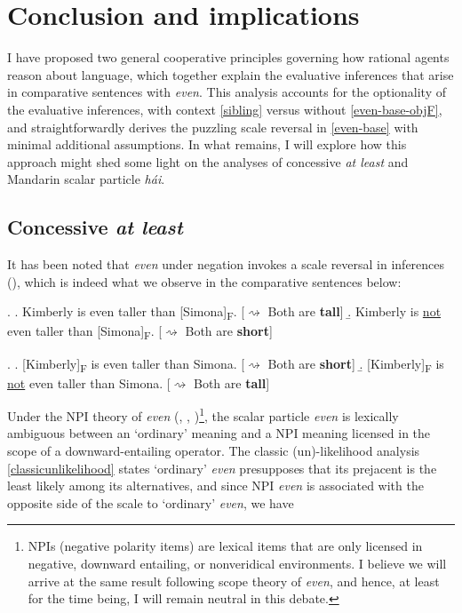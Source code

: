 \documentclass[12pt,letterpaper]{scrartcl}
\newcommand{\alignright}{\hspace*{\fill}}
\newcommand{\infer}{$\rightsquigarrow$ }
\newcommand{\sub}[1]{\textsubscript{#1}}
\begin{document}
\section{Conclusion and implications}

I have proposed two general cooperative principles governing how rational agents reason about language, which together explain the evaluative inferences that arise in comparative sentences with \textit{even}. This analysis accounts for the optionality of the evaluative inferences, with context \ref{sibling} versus without \ref{even-base-objF}, and straightforwardly derives the puzzling scale reversal in \ref{even-base} with minimal additional assumptions. In what remains, I will explore how this approach might shed some light on the analyses of concessive \textit{at least} and Mandarin scalar particle \textit{h\'{a}i}.

\subsection{Concessive \textit{at least}} 

It has been noted that \textit{even} under negation invokes a scale reversal in inferences (\cite{karttunen_conventional_1979}), which is indeed what we observe in the comparative sentences below:

\ex. \a. Kimberly is even taller than [Simona]\sub{F}. \alignright [\infer Both are \textbf{tall}] 
\b. Kimberly is \underline{not} even taller than [Simona]\sub{F}. \alignright [\infer Both are \textbf{short}] \label{not-even-objF}

\ex. \a. [Kimberly]\sub{F} is even taller than Simona. \alignright [\infer Both are \textbf{short}] 
\b. [Kimberly]\sub{F} is \underline{not} even taller than Simona. \alignright [\infer Both are \textbf{tall}] \label{not-even-subF}

Under the NPI theory of \textit{even} (\cite{rooth_association_1985}, \cite{rullmann_even_1997}, \cite{giannakidou_landscape_2007})\footnote{NPIs (negative polarity items) are lexical items that are only licensed in negative, downward entailing, or nonveridical environments. I believe we will arrive at the same result following scope theory of \textit{even}, and hence, at least for the time being, I will remain neutral in this debate.}, the scalar particle \textit{even} is lexically ambiguous between an `ordinary' meaning and a NPI meaning licensed in the scope of a downward-entailing operator. The classic (un)-likelihood analysis \ref{classicunlikelihood} states `ordinary' \textit{even} presupposes that its prejacent is the least likely among its alternatives, and since NPI \textit{even} is associated with the opposite side of the scale to `ordinary' \textit{even}, we have
\end{document}
